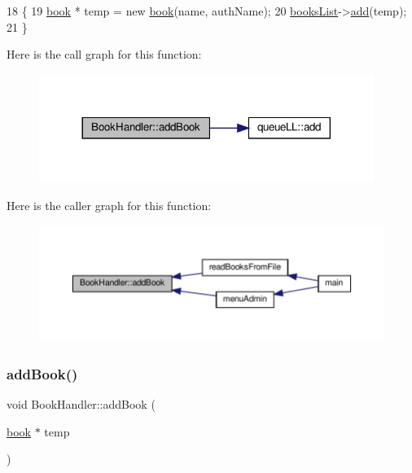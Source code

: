 \begin{DoxyCode}
18                                                             \{
19     \hyperlink{classbook}{book} * temp = \textcolor{keyword}{new} \hyperlink{classbook}{book}(name, authName);
20     \hyperlink{class_book_handler_a13a6c78422b3ad7acd5ebdb9555a0286}{booksList}->\hyperlink{classqueue_l_l_adcbcc26433da2c9d17b6cf0802d1d7d2}{add}(temp);
21 \}
\end{DoxyCode}
Here is the call graph for this function\+:
\nopagebreak
\begin{figure}[H]
\begin{center}
\leavevmode
\includegraphics[width=308pt]{class_book_handler_a29517e8c55796a94f29c48d6971e9f1d_cgraph}
\end{center}
\end{figure}
Here is the caller graph for this function\+:
\nopagebreak
\begin{figure}[H]
\begin{center}
\leavevmode
\includegraphics[width=350pt]{class_book_handler_a29517e8c55796a94f29c48d6971e9f1d_icgraph}
\end{center}
\end{figure}
\mbox{\label{class_book_handler_aac102920daa87a20f3e169f9c3cbc33b}} 
\subsubsection{\texorpdfstring{add\+Book()}{addBook()}\hspace{0.1cm}{\footnotesize\ttfamily [2/2]}}
{\footnotesize\ttfamily void Book\+Handler\+::add\+Book (\begin{DoxyParamCaption}\item[{\hyperlink{classbook}{book} $\ast$}]{temp }\end{DoxyParamCaption})}

